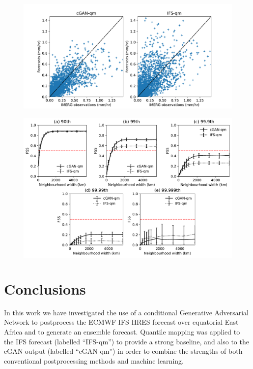 \documentclass{article}
\begin{document}
\begin{figure}
     \centering
     \includegraphics[width=1.05\textwidth]{images/scatter_mean_final-nologs-mam2018_217600_kenya.pdf}
     
     \caption{
     }
     \label{fig:scatter_extreme}
\end{figure}

\begin{figure}
     \centering
     \includegraphics[width=\textwidth]{images/fss_final-nologs-mam2018_217600_kenya.pdf}
     
     \caption{
     }
     \label{fig:fss_extreme}
\end{figure}

\section{Conclusions}


In this work we have investigated the use of a conditional Generative Adversarial Network to postprocess the ECMWF IFS HRES forecast over equatorial East Africa and to generate an ensemble forecast. Quantile mapping was applied to the IFS forecast (labelled ``IFS-qm'') to provide a strong baseline, and also to the cGAN output (labelled ``cGAN-qm'') in order to combine the strengths of both conventional postprocessing methods and machine learning.
\end{document}
